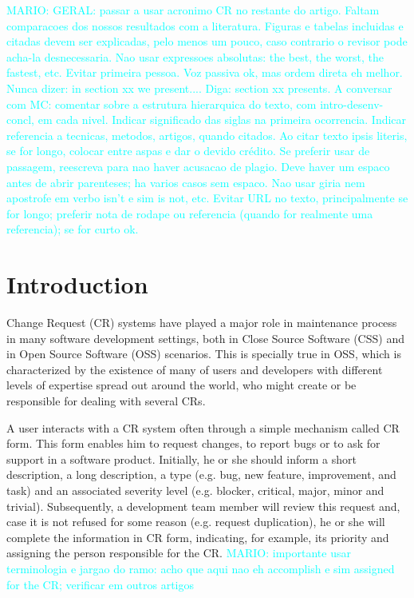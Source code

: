 \documentclass[10pt, conference]{IEEEtran}
\newcommand{\mario}[1]{\noindent\textcolor{cyan}{MARIO: {#1}}}
\newcommand{\mario}[1]{}
\begin{document}
\mario{GERAL: passar a usar acronimo CR no restante do artigo. Faltam comparacoes dos nossos resultados com a literatura. Figuras e tabelas incluidas e citadas devem ser explicadas, pelo menos um pouco, caso contrario o revisor pode acha-la desnecessaria. Nao usar expressoes absolutas: the best, the worst, the fastest, etc. Evitar primeira pessoa. Voz passiva ok, mas ordem direta eh melhor.  Nunca dizer: in section xx we present.... Diga: section xx presents. A conversar com MC: comentar sobre a estrutura hierarquica do texto, com intro-desenv-concl, em cada nivel. Indicar significado das siglas na primeira ocorrencia. Indicar referencia a tecnicas, metodos, artigos, quando citados. Ao citar texto ipsis literis, se for longo, colocar entre aspas e dar o devido crédito. Se preferir usar de passagem, reescreva para nao haver acusacao de plagio. Deve haver um espaco antes de abrir parenteses; ha varios casos sem espaco.  Nao usar giria nem apostrofe em verbo isn't e sim is not, etc. Evitar URL no texto, principalmente se for longo; preferir nota de rodape ou referencia (quando for realmente uma referencia); se for curto ok. }


\section{Introduction}
Change Request (CR) systems have played a major role in maintenance process in many software development settings, both in Close Source Software (CSS) and in Open Source Software (OSS) scenarios. This is specially true in OSS, which is characterized by the existence of many of users and developers with different levels of expertise spread out around the world, who might create or be responsible for dealing with several CRs\cite{Cavalcanti2014}. 

A user interacts with a CR system often through a simple mechanism called CR form. This form enables him to request changes, to report bugs or to ask for support in a software product\cite{Sommerville2010}. Initially, he or she should inform a short description, a long description, a type (e.g. bug, new feature, improvement, and task) and an associated severity level (e.g. blocker, critical, major, minor and trivial). Subsequently, a development team member will review this request and, case it is not refused for some reason (e.g. request duplication), he or she will complete the information in CR form, indicating, for example, its priority and assigning the person responsible for the CR. \mario{importante usar terminologia e jargao do ramo: acho que aqui nao eh accomplish e sim assigned for the CR; verificar em outros artigos}
\end{document}

